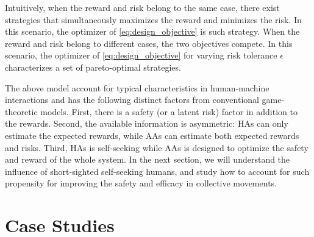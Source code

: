 \documentclass[letterpaper]{article} %
\begin{document}
Intuitively, when the reward and risk belong to the same case, there exist strategies that simultaneously maximizes the reward and minimizes the risk. In this scenario, the optimizer of \eqref{eq:design_objective} is such strategy. When the reward and risk belong to different cases, the two objectives compete. In this scenario, the optimizer of \eqref{eq:design_objective} for varying risk tolerance $\epsilon$ characterizes a set of pareto-optimal strategies.



The above model account for typical characteristics in human-machine interactions and has the following distinct factors from conventional game-theoretic models. First, there is a safety (or a latent risk) factor in addition to the rewards. Second, the available information is asymmetric: HAs can only estimate the expected rewards, while AAs can estimate both expected rewards and risks. Third, HAs is self-seeking while AAs is designed to optimize the safety and reward of the whole system. In the next section, we will understand the influence of short-sighted self-seeking humans, and study how to account for such propensity for improving the safety and efficacy in collective movements.

\section{Case Studies} \label{case_studies}
\end{document}
